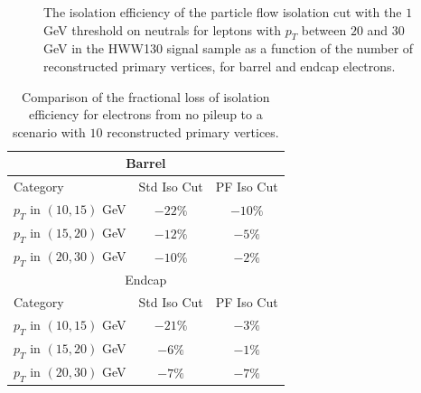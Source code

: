 \begin{figure}[!htbp]
\begin{center}
\caption{The isolation efficiency of the particle flow isolation cut with the $1$GeV threshold on neutrals
for leptons with $p_{T}$ between $20$ and $30$ GeV in the HWW130 signal sample as a function of the 
number of reconstructed primary vertices, for barrel and endcap electrons.}
\label{fig:EleIsoEffVsNVtx_PFIso_Pt20To30}
\end{center}
\end{figure}

\begin{table}[!htbp]
\begin{center}
\begin{tabular}{|l|c|c|}
\hline
\multicolumn{3}{|c|}{Barrel} \\
\hline
Category                  & Std Iso Cut & PF Iso Cut \\
\hline
$p_{T}$ in $(10,15)$ GeV  &  $-22\%$    & $-10\%$    \\
$p_{T}$ in $(15,20)$ GeV  &  $-12\%$    & $-5\%$     \\
$p_{T}$ in $(20,30)$ GeV  &  $-10\%$    & $-2\%$     \\
\hline
\multicolumn{3}{|c|}{Endcap} \\
\hline
Category                  & Std Iso Cut & PF Iso Cut \\
\hline
$p_{T}$ in $(10,15)$ GeV  &  $-21\%$    & $-3\%$    \\
$p_{T}$ in $(15,20)$ GeV  &  $-6\%$    & $-1\%$     \\
$p_{T}$ in $(20,30)$ GeV  &  $-7\%$    & $-7\%$     \\

\hline
\end{tabular}
\caption{Comparison of the fractional loss of isolation efficiency for electrons from no 
pileup to a scenario with $10$ reconstructed primary vertices. }
\label{tab:EleIsoEfficiency_LossFromPileup_CompareStdWithPF}
\end{center}
\end{table}



